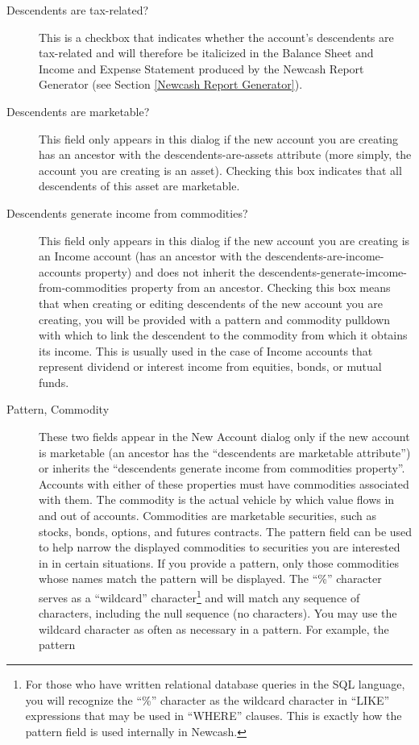 \documentclass{report}
\begin{document}
\begin{description}
\begin{description}
\item [Descendents are tax-related?] This is a checkbox that indicates whether the account's descendents are tax-related and will therefore be italicized in the Balance Sheet and Income and Expense Statement produced by the Newcash Report Generator (see Section \ref{Newcash Report Generator}).
\item [Descendents are marketable?] This field only appears in this dialog if the new account you are creating  has an ancestor with the descendents-are-assets attribute (more simply, the account you are creating is an asset). Checking this box indicates that all descendents of this asset are marketable. 
\item [Descendents generate income from commodities?] This field only appears in this dialog if the new account you are creating is an Income account (has an ancestor with the descendents-are-income-accounts property) and does not inherit the descendents-generate-imcome-from-commodities property from an ancestor. Checking this box means that when creating or editing descendents of the new account you are creating, you will be provided with a pattern and commodity pulldown with which to link the descendent to the commodity from which it obtains its income. This is usually used in the case of Income accounts that represent dividend or interest income from equities, bonds, or mutual funds.
\item [Pattern, Commodity] These two fields appear in the New Account dialog only if the new account is marketable (an ancestor has the ``descendents are marketable attribute'') or inherits the ``descendents generate income from commodities property''. Accounts with either of these properties must have commodities associated with them. The commodity is the actual vehicle by which value flows in and out of accounts. Commodities are marketable securities, such as stocks, bonds, options, and futures contracts.  The pattern field can be used to help narrow the displayed commodities to securities you are interested in in certain situations. If you provide a pattern, only those commodities whose names match the pattern will be displayed. The ``\%'' character serves as a ``wildcard'' character\footnote{For those who have written relational database queries in the SQL language, you will recognize the ``\%'' character as the wildcard character in ``LIKE'' expressions that may be used in ``WHERE'' clauses. This is exactly how the pattern field is used internally in Newcash.} and will match any sequence of characters, including the null sequence (no characters). You may use the wildcard character as often as necessary in a pattern. For example, the pattern

\end{description}
\end{description}
\end{document}
